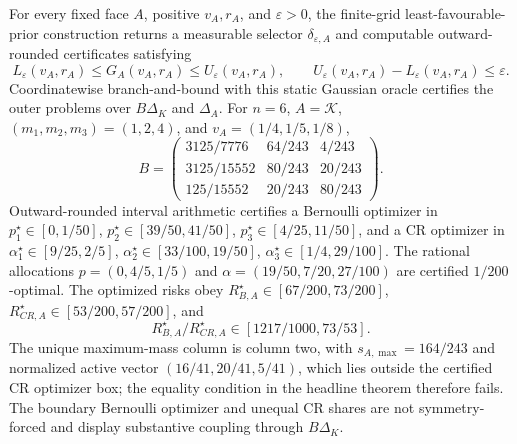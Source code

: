 For every fixed face \(A\), positive \(v_A,r_A\), and \(\varepsilon>0\), the finite-grid least-favourable-prior construction returns a measurable selector \(\delta_{\varepsilon,A}\) and computable outward-rounded certificates satisfying \[L_\varepsilon(v_A,r_A)\leq G_A(v_A,r_A)\leq U_\varepsilon(v_A,r_A),\qquad U_\varepsilon(v_A,r_A)-L_\varepsilon(v_A,r_A)\leq\varepsilon.\] Coordinatewise branch-and-bound with this static Gaussian oracle certifies the outer problems over \(B\Delta_K\) and \(\Delta_A\). For \(n=6\), \(A=\mathcal K\), \((m_1,m_2,m_3)=(1,2,4)\), and \(v_A=(1/4,1/5,1/8)\), \[B=\begin{pmatrix}3125/7776&64/243&4/243\\3125/15552&80/243&20/243\\125/15552&20/243&80/243\end{pmatrix}.\] Outward-rounded interval arithmetic certifies a Bernoulli optimizer in \(p_1^\star\in[0,1/50]\), \(p_2^\star\in[39/50,41/50]\), \(p_3^\star\in[4/25,11/50]\), and a CR optimizer in \(\alpha_1^\star\in[9/25,2/5]\), \(\alpha_2^\star\in[33/100,19/50]\), \(\alpha_3^\star\in[1/4,29/100]\). The rational allocations \(p=(0,4/5,1/5)\) and \(\alpha=(19/50,7/20,27/100)\) are certified \(1/200\)-optimal. The optimized risks obey \(R_{B,A}^\star\in[67/200,73/200]\), \(R_{CR,A}^\star\in[53/200,57/200]\), and \[R_{B,A}^\star/R_{CR,A}^\star\in[1217/1000,73/53].\] The unique maximum-mass column is column two, with \(s_{A,\max}=164/243\) and normalized active vector \((16/41,20/41,5/41)\), which lies outside the certified CR optimizer box; the equality condition in the headline theorem therefore fails. The boundary Bernoulli optimizer and unequal CR shares are not symmetry-forced and display substantive coupling through \(B\Delta_K\).